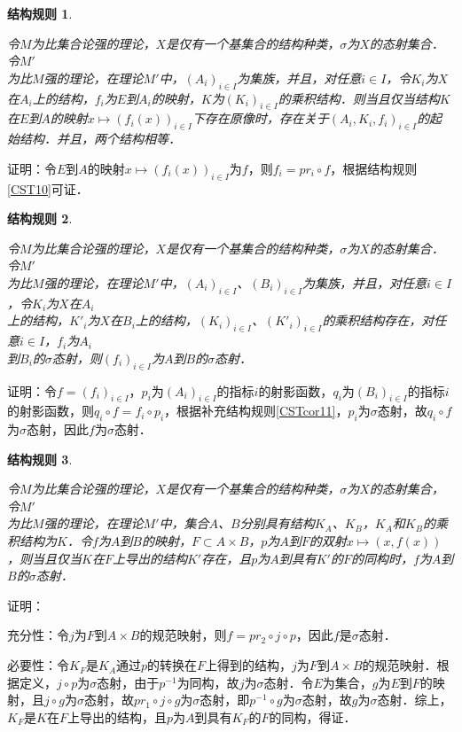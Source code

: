 \documentclass[12pt, a4paper, oneside]{book}
\newtheorem{CST}{结构规则}
\begin{document}
			\begin{CST}\label{CST15}
				\hfill\par
				令$M$为比集合论强的理论，$X$是仅有一个基集合的结构种类，$\sigma$为$X$的态射集合．令$M'$\\为比$M$强的理论，在理论$M'$中，$(A_i)_{i\in I}$为集族，并且，对任意$i\in I$，令$K_i$为$X$在$A_i$上的结构，$f_i$为$E$到$A_i$的映射，$K$为$(K_i)_{i\in I}$的乘积结构．则当且仅当结构$K$在$E$到$A$的映射$x\mapsto (f_i(x))_{i\in I}$下存在原像时，存在关于$(A_i, K_i, f_i)_{i\in I}$的起始结构．并且，两个结构相等．
			\end{CST}
			证明：令$E$到$A$的映射$x\mapsto (f_i(x))_{i\in I}$为$f$，则$f_i=pr_i\circ f$，根据结构规则\ref{CST10}可证．
			
			\begin{CST}\label{CST16}
				\hfill\par
				令$M$为比集合论强的理论，$X$是仅有一个基集合的结构种类，$\sigma$为$X$的态射集合．令$M'$\\为比$M$强的理论，在理论$M'$中，$(A_i)_{i\in I}$、$(B_i)_{i\in I}$为集族，并且，对任意$i\in I$，令$K_i$为$X$在$A_i$\\上的结构，${K'}_i$为$X$在$B_i$上的结构，$(K_i)_{i\in I}$、$({K'}_i)_{i\in I}$的乘积结构存在，对任意$i\in I$，$f_i$为$A_i$\\到$B_i$的$\sigma$态射，则$(f_i)_{i\in I}$为$A$到$B$的$\sigma$态射．
			\end{CST}
			证明：令$f=(f_i)_{i\in I}$，$p_i$为$(A_i)_{i\in I}$的指标$i$的射影函数，$q_i$为$(B_i)_{i\in I}$的指标$i$的射影函数，则$q_i\circ f=f_i\circ p_i$，根据补充结构规则\ref{CSTcor11}，$p_i$为$\sigma$态射，故$q_i\circ f$为$\sigma$态射，因此$f$为$\sigma$态射．
			
			\begin{CST}\label{CST17}
				\hfill\par
				令$M$为比集合论强的理论，$X$是仅有一个基集合的结构种类，$\sigma$为$X$的态射集合，令$M'$\\为比$M$强的理论，在理论$M'$中，集合$A$、$B$分别具有结构$K_A$、$K_B$，$K_A$和$K_B$的乘积结构为$K$．令$f$为$A$到$B$的映射，$F\subset A\times B$，$p$为$A$到$F$的双射$x\mapsto (x, f(x))$，则当且仅当$K$在$F$上导出的结构$K'$存在，且$p$为$A$到具有$K'$的$F$的同构时，$f$为$A$到$B$的$\sigma$态射．
			\end{CST}
			证明：
			\par
			充分性：令$j$为$F$到$A\times B$的规范映射，则$f=pr_2\circ j\circ p$，因此$f$是$\sigma$态射．
			\par
			必要性：令$K_F$是$K_A$通过$p$的转换在$F$上得到的结构，$j$为$F$到$A\times B$的规范映射．根据定义，$j\circ p$为$\sigma$态射，由于$p^{-1}$为同构，故$j$为$\sigma$态射．令$E$为集合，$g$为$E$到$F$的映射，且$j\circ g$为$\sigma$态射，故$pr_1\circ j\circ g$为$\sigma$态射，即$p^{-1}\circ g$为$\sigma$态射，故$g$为$\sigma$态射．综上，$K_F$是$K$在$F$上导出的结构，且$p$为$A$到具有$K_F$的$F$的同构，得证．
			
\end{document}
